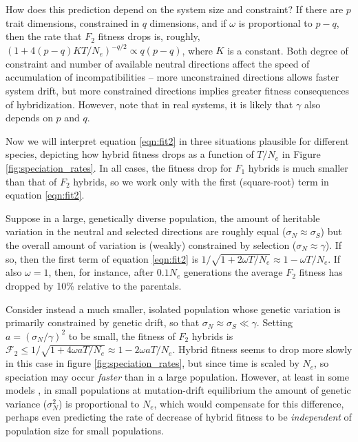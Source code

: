 \documentclass{article}
\newcommand{\1}{\mathbbm{1}}
\newcommand{\fit}{\mathcal{F}}
\begin{document}
How does this prediction depend on the system size and constraint?
If there are $p$ trait dimensions, constrained in $q$ dimensions,
and if $\omega$ is proportional to $p-q$,
then the rate that $F_2$ fitness drops is, roughly,
$(1 + 4 (p-q) K T/N_e)^{-q/2} \propto q (p-q)$, where $K$ is a constant.
Both degree of constraint and number of available neutral directions
affect the speed of accumulation of incompatibilities --
more unconstrained directions allows faster system drift,
but more constrained directions implies greater fitness consequences of hybridization.
However, note that in real systems, it is likely that $\gamma$ also depends on $p$ and $q$.

Now we will interpret equation \eqref{eqn:fit2} in three situations plausible for different species,
depicting how hybrid fitness drops as a function of $T/N_e$ in Figure \ref{fig:speciation_rates}.
In all cases, the fitness drop for $F_1$ hybrids is much smaller than that of $F_2$ hybrids,
so we work only with the first (square-root) term in equation \eqref{eqn:fit2}.

Suppose in a large, genetically diverse population,
the amount of heritable variation in the neutral and selected directions are roughly equal 
($\sigma_N \approx \sigma_S$)
but the overall amount of variation is (weakly) constrained by selection
($\sigma_N \approx \gamma$).
If so, then the first term of equation \eqref{eqn:fit2} is
$1/\sqrt{1 + 2 \omega T/N_e} \approx 1 - \omega T/N_e$.
If also $\omega=1$, then, for instance, after $0.1 N_e$ generations
the average $F_2$ fitness has dropped by 10\% relative to the parentals.

Consider instead a much smaller, isolated population
whose genetic variation is primarily constrained by genetic drift,
so that $\sigma_N \approx \sigma_S \ll \gamma$.
Setting $a = (\sigma_N/\gamma)^2$ to be small,
the fitness of $F_2$ hybrids is $\fit_2 \le 1/\sqrt{1 + 4 \omega a T/N_e} \approx 1 - 2 \omega a T/N_e$.
Hybrid fitness seems to drop more slowly in this case in figure \ref{fig:speciation_rates},
but since time is scaled by $N_e$, so speciation may occur \emph{faster} than in a large population.
However, at least in some models \citep{lynch1986phenotypic}, in small populations at mutation-drift equilibrium
the amount of genetic variance ($\sigma_N^2$) is proportional to $N_e$,
which would compensate for this difference, 
perhaps even predicting the rate of decrease of hybrid fitness to be \emph{independent} of population size
for small populations.
\end{document}
